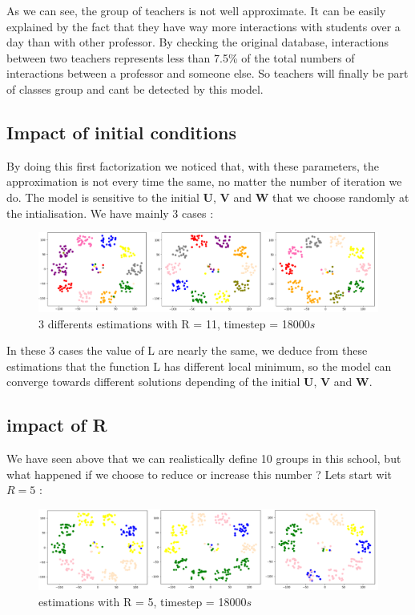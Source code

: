 \documentclass{article}
\begin{document}
As we can see, the group of teachers is not well approximate. It can be easily explained by the fact that they have way more 
interactions with students over a day than with other professor. By checking the original database, interactions between two teachers 
represents less than 7.5\% of the total numbers of interactions between a professor and someone else. 
So teachers will finally be part of classes group and cant be detected by this model.\\

\subsection{Impact of initial conditions}
By doing this first factorization we noticed that, with these parameters, the approximation is not every time the same, 
no matter the number of iteration we do. The model is sensitive to the initial $\mathbf{U}$, $\mathbf{V}$ and $\mathbf{W}$ that we
choose randomly at the intialisation. We have mainly 3 cases :

\begin{figure}[H]
    \centering
    \includegraphics[width=1\textwidth]{images/3cases_of_convergence.png}
    \caption{3 differents estimations with R = 11, timestep = 18000$s$}
\end{figure}

In these 3 cases the value of L are nearly the same, we deduce from these estimations that the function L has different local minimum, so the model can converge 
towards different solutions depending of the initial $\mathbf{U}$, $\mathbf{V}$ and $\mathbf{W}$.

\subsection{impact of R}

We have seen above that we can realistically define 10 groups in this school, but what happened if we choose to reduce or increase this number ?
Lets start wit $R = 5$ :\\

\begin{figure}[H]
    \centering
    \includegraphics[width=1\textwidth]{images/R=5_t=18000.png}
    \caption{estimations with R = 5, timestep = 18000$s$}
\end{figure}
\end{document}
